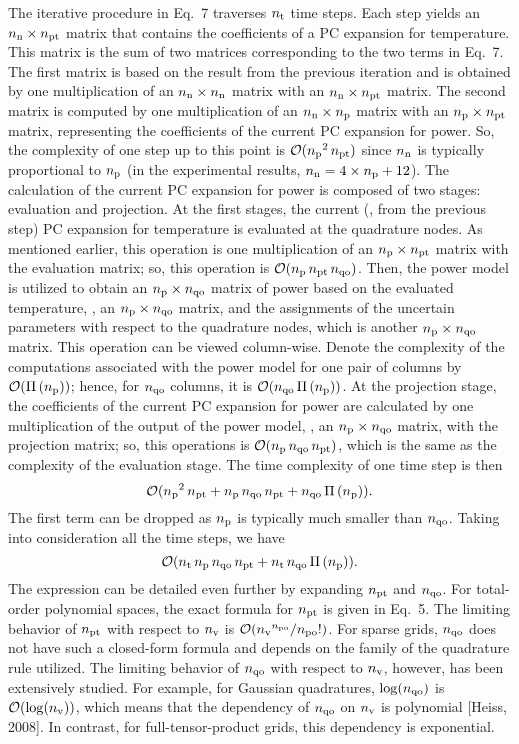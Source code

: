 \begin{authors}
The iterative procedure in Eq.~7 traverses ${n_\text{t}}$ time steps.
Each step yields an ${n_\text{n}} \times {n_\text{pt}}$ matrix that contains the coefficients of a PC expansion for temperature.
This matrix is the sum of two matrices corresponding to the two terms in Eq.~7.
The first matrix is based on the result from the previous iteration and is obtained by one multiplication of an ${n_\text{n}} \times {n_\text{n}}$ matrix with an ${n_\text{n}} \times {n_\text{pt}}$ matrix.
The second matrix is computed by one multiplication of an ${n_\text{n}} \times {n_\text{p}}$ matrix with an ${n_\text{p}} \times {n_\text{pt}}$ matrix, representing the coefficients of the current PC expansion for power.
So, the complexity of one step up to this point is $\mathcal{O}({n_\text{p}}^2 \, {n_\text{pt}})$ since ${n_\text{n}}$ is typically proportional to ${n_\text{p}}$ (in the experimental results, ${n_\text{n}} = 4 \times {n_\text{p}} + 12$).
The calculation of the current PC expansion for power is composed of two stages: evaluation and projection.
At the first stages, the current (\ie, from the previous step) PC expansion for temperature is evaluated at the quadrature nodes.
As mentioned earlier, this operation is one multiplication of an ${n_\text{p}} \times {n_\text{pt}}$ matrix with the evaluation matrix; so, this operation is $\mathcal{O}({n_\text{p}} \, {n_\text{pt}} \, {n_\text{qo}})$.
Then, the power model is utilized to obtain an ${n_\text{p}} \times {n_\text{qo}}$ matrix of power based on the evaluated temperature, \ie, an ${n_\text{p}} \times {n_\text{qo}}$ matrix, and the assignments of the uncertain parameters with respect to the quadrature nodes, which is another ${n_\text{p}} \times {n_\text{qo}}$ matrix.
This operation can be viewed column-wise.
Denote the complexity of the computations associated with the power model for one pair of columns by $\O(\oPower{\nprocs})$; hence, for ${n_\text{qo}}$ columns, it is $\O(\qdorder \, \oPower{\nprocs})$.
At the projection stage, the coefficients of the current PC expansion for power are calculated by one multiplication of the output of the power model, \ie, an ${n_\text{p}} \times {n_\text{qo}}$ matrix, with the projection matrix; so, this operations is $\mathcal{O}({n_\text{p}} \, {n_\text{qo}} \, {n_\text{pt}})$, which is the same as the complexity of the evaluation stage.
The time complexity of one time step is then
\[
  \O(\nprocs^2 \, \pcterms + \nprocs \, \qdorder \, \pcterms + \qdorder \, \oPower{\nprocs}).
\]
The first term can be dropped as ${n_\text{p}}$ is typically much smaller than ${n_\text{qo}}$.
Taking into consideration all the time steps, we have
\[
  \O(\nsteps \, \nprocs \, \qdorder \, \pcterms + \nsteps \, \qdorder \, \oPower{\nprocs}).
\]
The expression can be detailed even further by expanding ${n_\text{pt}}$ and ${n_\text{qo}}$.
For total-order polynomial spaces, the exact formula for ${n_\text{pt}}$ is given in Eq.~5.
The limiting behavior of ${n_\text{pt}}$ with respect to ${n_\text{v}}$ is $\mathcal{O}({n_\text{v}}^{n_\text{po}} / {n_\text{po}}!)$.
For sparse grids, ${n_\text{qo}}$ does not have such a closed-form formula and depends on the family of the quadrature rule utilized.
The limiting behavior of ${n_\text{qo}}$ with respect to ${n_\text{v}}$, however, has been extensively studied.
For example, for Gaussian quadratures, $\log({n_\text{qo}})$ is $\mathcal{O}(\log({n_\text{v}}))$, which means that the dependency of ${n_\text{qo}}$ on ${n_\text{v}}$ is polynomial [Heiss, 2008].
In contrast, for full-tensor-product grids, this dependency is exponential.


\end{authors}
